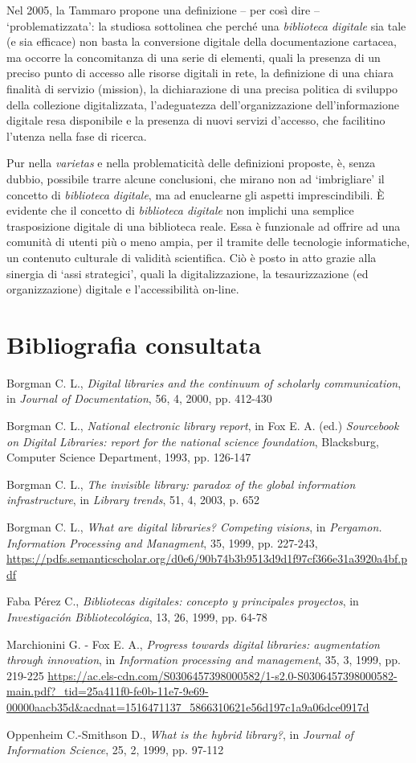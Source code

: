 Nel 2005, la Tammaro propone una definizione -- per così dire --
`problematizzata': la studiosa sottolinea che perché una
\emph{biblioteca digitale} sia tale (e sia efficace) non basta la
conversione digitale della documentazione cartacea, ma occorre la
concomitanza di una serie di elementi, quali la presenza di un preciso
punto di accesso alle risorse digitali in rete, la definizione di una
chiara finalità di servizio (mission), la dichiarazione di una precisa
politica di sviluppo della collezione digitalizzata, l'adeguatezza
dell'organizzazione dell'informazione digitale resa disponibile e la
presenza di nuovi servizi d'accesso, che facilitino l'utenza nella fase
di ricerca.

Pur nella \emph{varietas} e nella problematicità delle definizioni
proposte, è, senza dubbio, possibile trarre alcune conclusioni, che
mirano non ad `imbrigliare' il concetto di \emph{biblioteca digitale},
ma ad enuclearne gli aspetti imprescindibili. È evidente che il concetto
di \emph{biblioteca digitale} non implichi una semplice trasposizione
digitale di una biblioteca reale. Essa è funzionale ad offrire ad una
comunità di utenti più o meno ampia, per il tramite delle tecnologie
informatiche, un contenuto culturale di validità scientifica. Ciò è
posto in atto grazie alla sinergia di `assi strategici', quali la
digitalizzazione, la tesaurizzazione (ed organizzazione) digitale e
l'accessibilità on-line.

\section*{Bibliografia consultata}
{\parindent0pt 
Borgman C. L., \emph{Digital libraries and the continuum of scholarly
communication}, in \emph{Journal of Documentation}, 56, 4, 2000, pp.
412-430

Borgman C. L., \emph{National electronic library report}, in Fox E. A.
(ed.) \emph{Sourcebook on Digital Libraries: report for the national
science foundation}, Blacksburg, Computer Science Department, 1993, pp.
126-147

Borgman C. L., \emph{The invisible library: paradox of the global
information infrastructure}, in \emph{Library trends}, 51, 4, 2003, p.
652

Borgman C. L., \emph{What are digital libraries? Competing visions}, in
\emph{Pergamon. Information Processing and Managment}, 35, 1999, pp.
227-243,
\url{https://pdfs.semanticscholar.org/d0e6/90b74b3b9513d9d1f97cf366e31a3920a4bf.pdf}

Faba Pérez C., \emph{Bibliotecas digitales: concepto y principales
proyectos}, in \emph{Investigación Bibliotecológica}, 13, 26, 1999, pp.
64-78

Marchionini G. - Fox E. A., \emph{Progress towards digital libraries:
augmentation through innovation}, in \emph{Information processing and
management}, 35, 3, 1999, pp. 219-225
\url{https://ac.els-cdn.com/S0306457398000582/1-s2.0-S0306457398000582-main.pdf?_tid=25a411f0-fe0b-11e7-9e69-00000aacb35d\&acdnat=1516471137_5866310621e56d197c1a9a06dce0917d}

Oppenheim C.-Smithson D., \emph{What is the hybrid library?}, in
\emph{Journal of Information Science}, 25, 2, 1999, pp. 97-112
}

